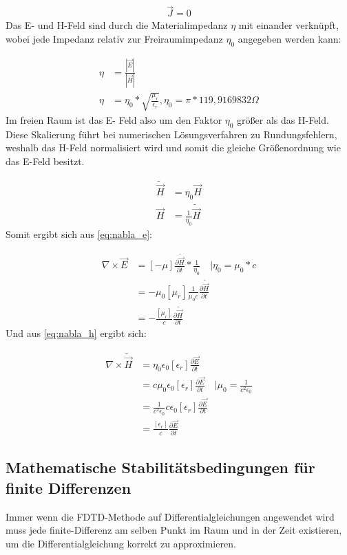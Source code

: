 \documentclass[11pt, ngerman]{article}
\begin{document}
\begin{align}
	\vec{J} = 0
\end{align}
Das E- und H-Feld sind durch die Materialimpedanz \(\eta\) mit einander verkn\"upft, wobei jede
Impedanz relativ zur Freiraumimpedanz \(\eta_0\) angegeben werden kann:

\begin{align}
	\eta &= \frac{|\vec{E}|}{|\vec{H}|}\\
	\eta &= \eta_0 * \sqrt{\frac{\mu_r}{\epsilon_r}}, \eta_0 = \pi*119,9169832\Omega
\end{align}
Im freien Raum ist das E- Feld also um den Faktor \(\eta_0\) gr\"o{\ss}er als das H-Feld.
Diese Skalierung f\"uhrt bei numerischen L\"osungsverfahren zu Rundungsfehlern,
weshalb das H-Feld normalisiert wird und somit die gleiche Gr\"o{\ss}enordnung wie das
E-Feld besitzt.\cite{normalize_h_field}

\begin{align}
	\widetilde{\vec{H}} &= \eta_0\vec{H}\\
	\vec{H} &= \frac{1}{\eta_0}\widetilde{\vec{H}}
\end{align}
\newpage
\noindent Somit ergibt sich aus \cref{eq:nabla_e}:

\begin{align}
	\nabla\times\vec{E} &= [-\mu]\frac{\partial\widetilde{\vec{H}}}{\partial t} * \frac{1}{\eta_0}\quad\vert \eta_0 = \mu_0 * c\nonumber\\
	&=-\mu_0[\mu_r]\frac{1}{\mu_0c}\frac{\partial\widetilde{\vec{H}}}{\partial t}\nonumber\\
	&=-\frac{[\mu_r]}{c}\frac{\partial\widetilde{\vec{H}}}{\partial t}
\end{align}
Und aus \cref{eq:nabla_h} ergibt sich:

\begin{align}
	\nabla\times\widetilde{\vec{H}} &= \eta_0\epsilon_0[\epsilon_r]\frac{\partial\vec{E}}{\partial t}\nonumber\\
	&= c\mu_0\epsilon_0[\epsilon_r]\frac{\partial\vec{E}}{\partial t}\quad\vert \mu_0 = \frac{1}{c^2\epsilon_0}\nonumber\\
	&= \frac{1}{c^2\epsilon_0}c\epsilon_0[\epsilon_r]\frac{\partial\vec{E}}{\partial t}\nonumber\\
	&= \frac{[\epsilon_r]}{c}\frac{\partial\vec{E}}{\partial t}
\end{align}


\subsection{Mathematische Stabilit\"atsbedingungen f\"ur finite Differenzen}
Immer wenn die FDTD-Methode auf Differentialgleichungen angewendet
wird muss jede finite-Differenz am selben Punkt im Raum und in der
Zeit existieren, um die Differentialgleichung korrekt zu approximieren.\cite{fdtd_stabilitaet}
\end{document}
